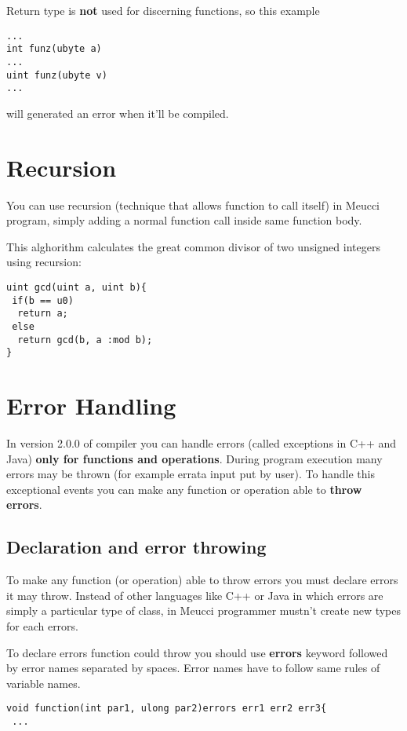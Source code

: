 \documentclass[10pt]{book}%
\renewcommand{\emph}[1]{\textbf{#1}}
\newenvironment{codeenv}{
\begin{mdframed}[backgroundcolor=black!20,topline=false,leftline=false,rightline=false,bottomline=false]
}
{\end{mdframed}}
\begin{document}
Return type is \emph{not} used for discerning functions, so this example
\begin{codeenv}
\begin{verbatim}
...
int funz(ubyte a)
...
uint funz(ubyte v)
...
\end{verbatim}
\end{codeenv}
will generated an error when it'll be compiled.

\section{Recursion}
You can use recursion (technique that allows function to call itself) in Meucci program, simply adding a normal function call inside same function body. 

This alghorithm calculates the great common divisor of two unsigned integers using recursion:
\begin{codeenv}
\begin{verbatim}
uint gcd(uint a, uint b){
 if(b == u0)
  return a;
 else
  return gcd(b, a :mod b);
}
\end{verbatim}
\end{codeenv}

\section{Error Handling}
In version 2.0.0 of compiler you can handle errors (called exceptions in C++ and Java) \emph{only for functions and operations}.
During program execution many errors may be thrown (for example errata input put by user). To handle this exceptional events you can make any function or operation able to \emph{throw errors}. 

\subsection{Declaration and error throwing}
To make any function (or operation) able to throw errors you must declare errors it may throw. Instead of other languages like C++ or Java in which errors are simply a particular type of class, in Meucci programmer mustn't create new types for each errors.

To declare errors function could throw you should use \emph{errors} keyword followed by error names separated by spaces. Error names have to follow same rules of variable names.
\begin{codeenv}
\begin{verbatim}
void function(int par1, ulong par2)errors err1 err2 err3{
 ...
\end{verbatim}
\end{codeenv}
\end{document}
